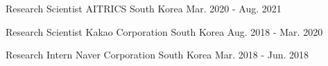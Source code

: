 

\begin{cventries}

  \cventry
    {Research Scientist} %
    {AITRICS} %
    {South Korea} %
    {Mar. 2020 - Aug. 2021} %
    { }

  \vspace{-10pt}
  \cventry
    {Research Scientist} %
    {Kakao Corporation} %
    {South Korea} %
    {Aug. 2018 - Mar. 2020} %
    { }

  \vspace{-10pt}
  \cventry
    {Research Intern} %
    {Naver Corporation} %
    {South Korea} %
    {Mar. 2018 - Jun. 2018} %
    { }
\end{cventries}
